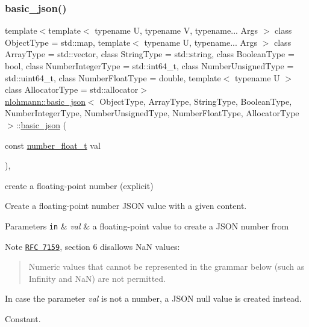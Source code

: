 \subsubsection{\texorpdfstring{basic\+\_\+json()}{basic\_json()}\hspace{0.1cm}{\footnotesize\ttfamily [16/23]}}
{\footnotesize\ttfamily template$<$template$<$ typename U, typename V, typename... Args $>$ class Object\+Type = std\+::map, template$<$ typename U, typename... Args $>$ class Array\+Type = std\+::vector, class String\+Type  = std\+::string, class Boolean\+Type  = bool, class Number\+Integer\+Type  = std\+::int64\+\_\+t, class Number\+Unsigned\+Type  = std\+::uint64\+\_\+t, class Number\+Float\+Type  = double, template$<$ typename U $>$ class Allocator\+Type = std\+::allocator$>$ \\
\hyperlink{classnlohmann_1_1basic__json}{nlohmann\+::basic\+\_\+json}$<$ Object\+Type, Array\+Type, String\+Type, Boolean\+Type, Number\+Integer\+Type, Number\+Unsigned\+Type, Number\+Float\+Type, Allocator\+Type $>$\+::\hyperlink{classnlohmann_1_1basic__json}{basic\+\_\+json} (\begin{DoxyParamCaption}\item[{const \hyperlink{classnlohmann_1_1basic__json_a74a0013e847fdc574b48f931f0e757e1}{number\+\_\+float\+\_\+t}}]{val }\end{DoxyParamCaption})\hspace{0.3cm}{\ttfamily [inline]}, {\ttfamily [noexcept]}}



create a floating-\/point number (explicit) 

Create a floating-\/point number J\+S\+ON value with a given content.


\begin{DoxyParams}[1]{Parameters}
\mbox{\tt in}  & {\em val} & a floating-\/point value to create a J\+S\+ON number from\\
\hline
\end{DoxyParams}
\begin{DoxyNote}{Note}
\href{http://www.rfc-editor.org/rfc/rfc7159.txt}{\tt R\+FC 7159}, section 6 disallows NaN values\+: \begin{quote}
Numeric values that cannot be represented in the grammar below (such as Infinity and NaN) are not permitted. \end{quote}
In case the parameter {\itshape val} is not a number, a J\+S\+ON null value is created instead.
\end{DoxyNote}
Constant.

